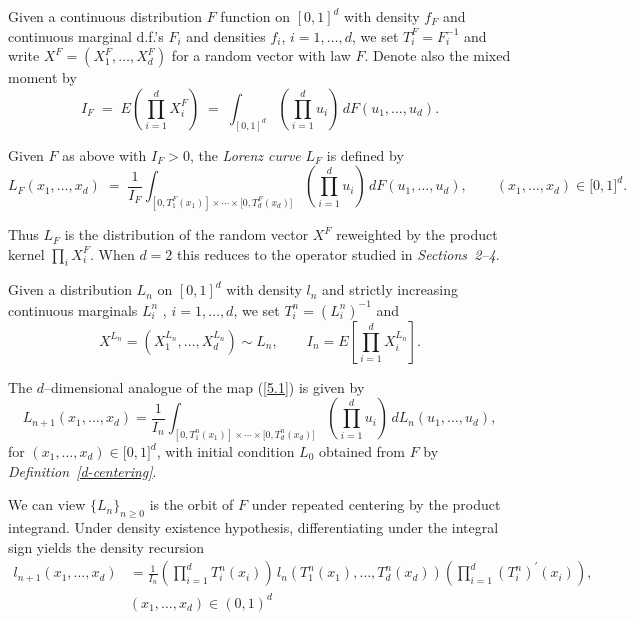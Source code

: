 \documentclass[onecolumn]{article}
\newtheorem{definition}[theorem]{Definition}
\let\olddefinition\definition
\let\endolddefinition\enddefinition
\renewenvironment{definition}{\olddefinition\normalfont}{\endolddefinition}
\begin{document}
\begin{definition}
\noindent \label{d-centering} Given a continuous distribution $F$ function
on $[0,1]^{d}$ with density $f_{F}$ and continuous marginal d.f.'s $F_{i}$
and densities $f_{i}$, $i=1,\dots ,d$, we set $T_{i}^{F}=F_{i}^{-1}$ and
write $X^{F}=(X_{1}^{F},\dots ,X_{d}^{F})$ for a random vector with law $F$.
Denote also the mixed moment by%
\begin{equation}
I_{F}\;=\;E(\prod_{i=1}^{d}X_{i}^{F})\;=\;\int_{[0,1]^{d}}(%
\prod_{i=1}^{d}u_{i})\,dF(u_{1},\dots ,u_{d}).  \label{940}
\end{equation}

Given $F$ as above with $I_{F}>0$, the \textit{Lorenz curve} $L_{F}$ is
defined by 
\begin{equation}
L_{F}(x_{1},\dots ,x_{d})\;=\;\frac{1}{I_{F}}\int_{[0,T_{1}^{F}(x_{1})]%
\times \cdots \times \lbrack
0,T_{d}^{F}(x_{d})]}(\prod_{i=1}^{d}u_{i})\,dF(u_{1},\dots ,u_{d}),\qquad
(x_{1},\dots ,x_{d})\in \lbrack 0,1]^{d}.  \label{941}
\end{equation}
\end{definition}

Thus $L_{F}$ is the distribution of the random vector $X^{F}$ reweighted by
the product kernel $\prod_{i}X_{i}^{F}$. When $d=2$ this reduces to the
operator studied in \textit{Sections~2--4}.

\begin{definition}
\noindent \label{d-centering-n} Given a distribution $L_{n}$ on $[0,1]^{d}$
with density $l_{n}$ and strictly increasing continuous marginals $L_{i}^{n}$%
, $i=1,\dots ,d$, we set $T_{i}^{n}=(L_{i}^{n})^{-1}$ and 
\begin{equation}
X^{L_{n}}=(X_{1}^{L_{n}},\dots ,X_{d}^{L_{n}})\sim L_{n},\qquad
I_{n}=E[\prod_{i=1}^{d}X_{i}^{L_{n}}].  \label{941a}
\end{equation}

The $d$--dimensional analogue of the map (\ref{5.1}) is given by 
\begin{equation}
L_{n+1}(x_{1},\dots ,x_{d})=\frac{1}{I_{n}}\int_{[0,T_{1}^{n}(x_{1})]\times
\cdots \times \lbrack
0,T_{d}^{n}(x_{d})]}(\prod_{i=1}^{d}u_{i})\,dL_{n}(u_{1},\dots ,u_{d}),
\label{941b}
\end{equation}%
for $(x_{1},\dots ,x_{d})\in \lbrack 0,1]^{d}$, with initial condition $%
L_{0} $ obtained from $F$ by \textit{Definition~\ref{d-centering}}.
\end{definition}

We can view $\{L_{n}\}_{n\geq 0}$ is the orbit of $F$ under repeated
centering by the product integrand. Under density existence hypothesis,
differentiating under the integral sign yields the density recursion 
\begin{equation}
\begin{split}
l_{n+1}(x_{1},\dots ,x_{d})& =\frac{1}{I_{n}}%
(\prod_{i=1}^{d}T_{i}^{n}(x_{i}))\,l_{n}(T_{1}^{n}(x_{1}),\dots
,T_{d}^{n}(x_{d}))(\prod_{i=1}^{d}(T_{i}^{n})^{\prime }(x_{i})), \\
& (x_{1},\dots ,x_{d})\in (0,1)^{d}
\end{split}
\label{941c}
\end{equation}
\end{document}
